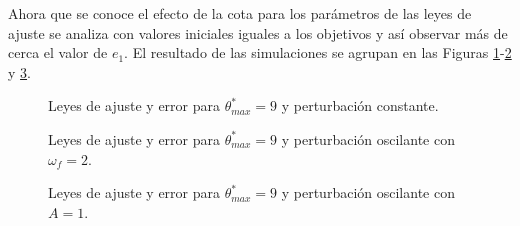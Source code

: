\documentclass[letterpaper,11pt]{article} %
\begin{document}
Ahora que se conoce el efecto de la cota para los parámetros de las leyes de ajuste se analiza con valores iniciales iguales a los objetivos y así observar más de cerca el valor de $e_1$. El resultado de las simulaciones se agrupan en las Figuras \ref{cota1}-\ref{cota2} y \ref{cota3}.
\newpage
\begin{figure}[h]
	\centering
	\captionsetup{justification=centering}
	\caption{Leyes de ajuste y error para $\theta_{max}^* =9$ y perturbación constante.}
	\label{cota1}
\end{figure}
\newpage
\begin{figure}[h]
	\centering
	\captionsetup{justification=centering}
	\caption{Leyes de ajuste y error para $\theta_{max}^* =9$ y perturbación oscilante con $\omega_f=2$.}
	\label{cota2}
\end{figure}
\newpage
\begin{figure}[h]
	\centering
	\captionsetup{justification=centering}
	\caption{Leyes de ajuste y error para $\theta_{max}^* =9$ y perturbación oscilante con $A=1$.}
	\label{cota3}
\end{figure}
\end{document}
